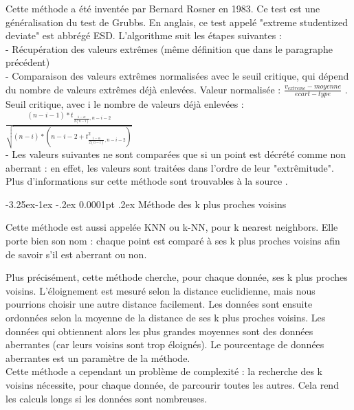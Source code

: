 \documentclass[a4paper,12pt]{article} %
\makeatletter
\renewcommand\paragraph{\@startsection{paragraph}{4}{\z@}%
                                      {-3.25ex\@plus -1ex \@minus -.2ex}%
                                      {0.0001pt \@plus .2ex}%
                                      {\normalfont\normalsize\bfseries}}
\makeatother
\begin{document}
                        Cette méthode a été inventée par Bernard Rosner en 1983. Ce test est une généralisation du test de Grubbs. En anglais, ce test appelé "extreme studentized deviate" est abbrégé ESD. L’algorithme suit les étapes suivantes : \\
                        - Récupération des valeurs extrêmes (même déﬁnition que dans le paragraphe précédent)\\
                        - Comparaison des valeurs extrêmes normalisées avec le seuil critique, qui dépend du nombre de valeurs extrêmes déjà enlevées. Valeur normalisée : $\frac{v_{extreme}-moyenne}{ecart-type}$ . Seuil critique, avec i le nombre de valeurs déjà enlevées : 
                        $\frac{    (n-i-1)*t _{     \frac{1-\alpha}{2(n-i)},n-i-2     }       }  {        \sqrt{       (n-i)*(n-i-2+t^2_{   \frac{1-\alpha}{2(n-i)},n-i-2} )      }     }  $ \\
                         - Les valeurs suivantes ne sont comparées que si un point est décrété comme non aberrant : en eﬀet, les valeurs sont traitées dans l’ordre de leur "extrêmitude".\\
                         
                         Plus d'informations sur cette méthode sont trouvables à la source \cite{DES}.

				
					\paragraph{Méthode des k plus proches voisins}
					
					    Cette méthode est aussi appelée KNN ou k-NN, pour k nearest neighbors. Elle porte bien son nom : chaque point est comparé à ses k plus proches voisins afin de savoir s'il est aberrant ou non.
    					
    					Plus précisément, cette méthode cherche, pour chaque donnée, ses k plus proches voisins. L'éloignement est mesuré selon la distance euclidienne, mais nous pourrions choisir une autre distance facilement.
    				 Les données sont ensuite ordonnées selon la moyenne de la distance de ses k plus proches voisins. Les données qui obtiennent alors les plus grandes moyennes sont des données aberrantes (car leurs voisins sont trop éloignés). Le pourcentage de données aberrantes est un paramètre de la méthode.\\
    					
    					Cette méthode a cependant un problème de complexité : la recherche des k voisins nécessite, pour chaque donnée, de parcourir toutes les autres. Cela rend les calculs longs si les données sont nombreuses.
                        
\end{document}
